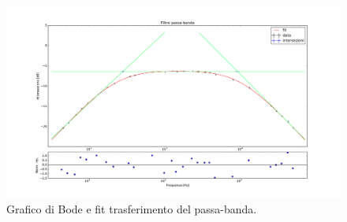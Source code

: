 \documentclass[10pt,a4paper]{article}
\begin{document}
\begin{figure}
	\centering
	\includegraphics[scale=0.4]{plt_passa_banda.pdf}
	\caption{Grafico di Bode e fit trasferimento del passa-banda.\label{f:fit1}}
\end{figure}
\end{document}
